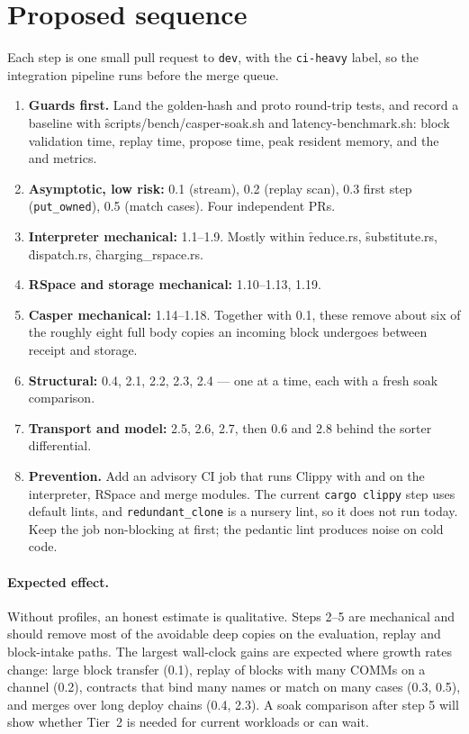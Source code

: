 \documentclass[11pt]{article}
\begin{document}
\section{Proposed sequence}
\label{sec:measure}

Each step is one small pull request to \texttt{dev}, with the \texttt{ci-heavy} label, so the
integration pipeline runs before the merge queue.

\begin{enumerate}
\item \textbf{Guards first.} Land the golden-hash and proto round-trip tests, and record a
baseline with \f{scripts/bench/casper-soak.sh} and \f{latency-benchmark.sh}: block validation
time, replay time, propose time, peak resident memory, and the
 and  metrics.
\item \textbf{Asymptotic, low risk:} 0.1 (stream), 0.2 (replay scan), 0.3 first step
(\texttt{put\_owned}), 0.5 (match cases). Four independent PRs.
\item \textbf{Interpreter mechanical:} 1.1--1.9. Mostly within \f{reduce.rs},
\f{substitute.rs}, \f{dispatch.rs}, \f{charging_rspace.rs}.
\item \textbf{RSpace and storage mechanical:} 1.10--1.13, 1.19.
\item \textbf{Casper mechanical:} 1.14--1.18. Together with 0.1, these remove about six of the
roughly eight full body copies an incoming block undergoes between receipt and storage.
\item \textbf{Structural:} 0.4, 2.1, 2.2, 2.3, 2.4 --- one at a time, each with a fresh soak
comparison.
\item \textbf{Transport and model:} 2.5, 2.6, 2.7, then 0.6 and 2.8 behind the sorter
differential.
\item \textbf{Prevention.} Add an advisory CI job that runs Clippy with
 and  on the interpreter, RSpace and
merge modules. The current \texttt{cargo clippy} step uses default lints, and
\texttt{redundant\_clone} is a nursery lint, so it does not run today. Keep the job
non-blocking at first; the pedantic lint produces noise on cold code.
\end{enumerate}

\paragraph{Expected effect.} Without profiles, an honest estimate is qualitative. Steps 2--5 are
mechanical and should remove most of the avoidable deep copies on the evaluation, replay and
block-intake paths. The largest wall-clock gains are expected where growth rates change: large
block transfer (0.1), replay of blocks with many COMMs on a channel (0.2), contracts that bind
many names or match on many cases (0.3, 0.5), and merges over long deploy chains (0.4, 2.3). A
soak comparison after step 5 will show whether Tier~2 is needed for current workloads or can wait.
\end{document}
